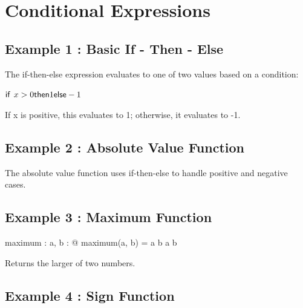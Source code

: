 \documentclass[a4paper,10pt,fleqn]{article}
\begin{document}
\section*{Conditional Expressions}

\subsection*{Example 1 : Basic If - Then - Else}

\noindent The if-then-else expression evaluates to one of two values based on a condition:

\bigskip

\noindent
$\IF x > 0 \THEN 1 \ELSE -1$


\noindent If x is positive, this evaluates to 1; otherwise, it evaluates to -1.

\bigskip

\subsection*{Example 2 : Absolute Value Function}


\noindent The absolute value function uses if-then-else to handle positive and negative cases.

\bigskip

\subsection*{Example 3 : Maximum Function}

\begin{axdef}
maximum : \nat \cross \nat \fun \nat
\where
\forall a, b : \nat @ maximum(a, b) = \IF a \geq b \THEN a \ELSE b
\end{axdef}

\noindent Returns the larger of two numbers.

\bigskip

\subsection*{Example 4 : Sign Function}
\end{document}
